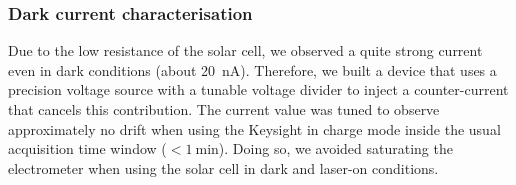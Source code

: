   

\subsubsection{Dark current characterisation}

Due to the low resistance of the solar cell, we observed a quite strong current even in dark conditions (about \SI{20}{\nano\ampere}). Therefore, we built a device that uses a precision voltage source with a tunable voltage divider to inject a counter-current that cancels this contribution. The current value was tuned to observe approximately no drift when using the Keysight in charge mode inside the usual acquisition time window ($< \SI{1}{\minute}$). Doing so, we avoided saturating the electrometer when using the solar cell in dark and laser-on conditions. 

